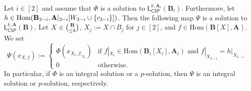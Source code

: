 \documentclass[a4paper,english, thm-restate]{lipics-v2021}
\DeclarePairedDelimiter\set{\lbrace}{\rbrace}
\newcommand{\StructA}{\mathbf{A}}
\newcommand{\StructB}{\mathbf{B}}
\newcommand{\restrict}[2]{#1|_{#2}}
\newcommand{\Hom}[2]{\mathrm{Hom}(#1,#2)}
\newcommand{\leqs}{\mathsf{L}}
\newcommand{\cspiso}[3]{\leqs^{#1,#2}_{\mathsf{CSP}}(#3)}
\begin{document}
	\begin{lemma}
		\label{lem:hom-or-solution}
		Let  $i \in [2]$ and assume that $\Phi$ is a solution to $\cspiso{k}{\StructA_i}{\StructB_i}$.
		Furthermore, let $h \in \Hom{\StructB_{3-i}}{\restrict{\StructA}{3-i}[W_{3-i}\cup\set{c_{3-i}}]}$.
		Then the following map $\Psi$ is a solution to $\cspiso{k}{\StructA}{\StructB}$.
		Let $X \in \tbinom{\StructB}{\leq k}$, $X_j := X \cap B_j$ for $j\in[2]$, and $f \in \Hom{\StructB[X]}{\StructA}$.
		We set
		\[
		\Psi(x_{X,f}) := \begin{cases}
			\Phi(x_{X_i, \restrict{f}{X_i}}) & \text{if }
			\restrict{f}{X_i} \in \Hom{\StructB_i[X_i]}{\StructA_i} \text { and } \restrict{f}{X_{3-i}} = \restrict{h}{X_{3-i}}\\
			0 & \text{otherwise.}
		\end{cases}
		\]
		In particular, if $\Phi$ is an integral solution or a $p$-solution,
		then $\Psi$ is an integral solution or $p$-solution, respectively.
	\end{lemma}
\end{document}
